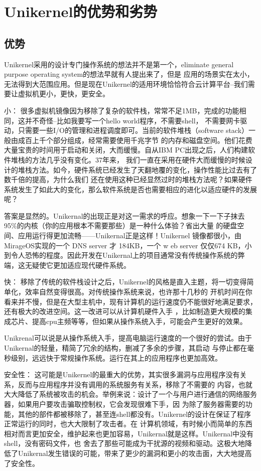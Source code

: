 \chapter{Unikernel的优势和劣势}

\section{优势}

Unikernel采用的设计专门操作系统的想法并不是第一个，eliminate general purpose operating system的想法早就有人提出来了，但是
应用的场景实在太小，无法得到大范围应用。但是现在Unikernel的适用环境恰恰符合云计算平台--我们需要让虚拟机更小，更快，更安全。

小： 很多虚拟机镜像因为移除了复杂的软件栈，常常不足1MB，完成的功能相同，这并不奇怪--比如我要写一个hello world程序，不需要shell，
不需要网卡驱动，只需要一些I/O的管理和进程调度即可。当前的软件堆栈（software stack）一般由成百上千个部分组成，经常需要使用千兆字节
的内存和磁盘空间。他们花费大量宝贵的时间用于启动和关闭，大而缓慢。自从IBM PC出现之后，人们构建软件堆栈的方法几乎没有变化。37年来，
我们一直在采用在硬件大而缓慢的时候设计的堆栈方法。如今，硬件系统已经发生了天翻地覆的变化，操作性能比过去有了数千倍的提高，为什么我们
还在使用这种已经显然过时的堆栈方法呢？如果硬件系统发生了如此大的变化，那么软件系统是否也需要相应的进化以适应硬件的发展呢？

答案是显然的。Unikernal的出现正是对这一需求的呼应。想象一下一下子抹去95\%的内核（你的应用根本不需要那些）是一种什么体验？省出大量
的硬盘空间、应用运行得更加流畅——Unikernal正是这样！Unikernel 镜像都很小，由 MirageOS实现的一个 DNS server 才 184KB，一个 w
eb server 仅仅674 KB，小到令人恐怖的程度。因此开发在Unikernal上的项目通常没有传统操作系统的弊端，这无疑使它更加适应现代硬件系统。

快： 移除了传统的软件栈设计之后，Unikernel的风格是直入主题，将一切变得简单化，效率自然变得很高。对传统操作系统来说，也许那十几秒的
开机时间在你看来并不慢，但是在大型主机中，现有计算机的运行速度仍不能很好地满足要求，还有极大的改进空间。这一改进可以从计算机硬件入手
，比如制造更大规模的集成芯片、提高cpu主频等等，但如果从操作系统入手，可能会产生更好的效果。

Unikrenal可以说是从操作系统入手，提高电脑运行速度的一个很好的尝试。由于Unikernal的轻量，精简了冗余的结构，删减了多余的步骤，其启动
与停止都在毫秒级别，远远快于常规操作系统。运行在其上的应用程序也更加高效。

安全性： 这可能是Unikernel的最重大的优势，其实很多漏洞与应用程序没有关系，反而与应用程序并没有调用的系统服务有关系，移除了不需要的
内容，也就大大降低了系统被攻击的机会。举例来说：设计了一个与用户进行通信的网络服务器，如果用户要攻击骗取控制权，它会发现很难下手，因
为除了服务器需要的功能，其他的部件都被移除了，甚至连shell都没有。Unikernel的设计在保证了程序正常运行的同时，也大大限制了攻击者。在
计算机领域，有时候小而简单的东西相对而言更加安全，维护起来也更加容易，Unikernal就是这样。Unikernal中没有shell，没有密码文件，也
舍去了那些可能成为干扰源的视频和驱动。这极大地降低了Unikernal发生错误的可能，带来了更少的漏洞和更小的攻击面，大大地提高了安全性。

